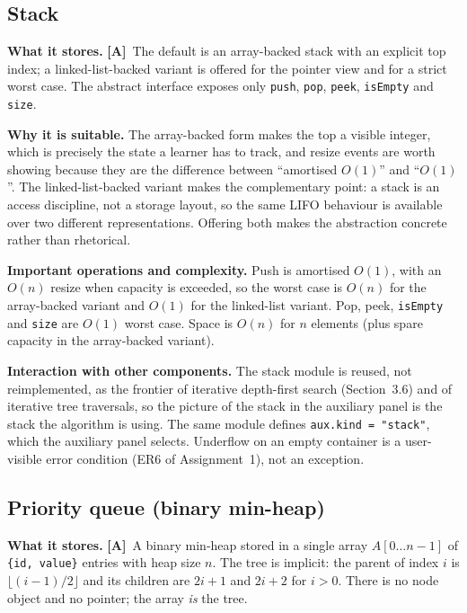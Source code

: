 \documentclass[11pt,a4paper]{article}
\newcommand{\A}{\textcolor{asmc}{\textbf{[A]}}}     %
\newcommand{\ct}[1]{\texttt{#1}}
\begin{document}
\subsection{Stack}

\noindent\textbf{What it stores.} \A\ The default is an array-backed stack with an explicit top
index; a linked-list-backed variant is offered for the pointer view and for a strict worst case.
The abstract interface exposes only \ct{push}, \ct{pop}, \ct{peek}, \ct{isEmpty} and \ct{size}.

\smallskip
\noindent\textbf{Why it is suitable.} The array-backed form makes the top a visible integer, which
is precisely the state a learner has to track, and resize events are worth showing because they
are the difference between ``amortised $O(1)$'' and ``$O(1)$''. The linked-list-backed variant
makes the complementary point: a stack is an access discipline, not a storage layout, so the same
LIFO behaviour is available over two different representations. Offering both makes the abstraction
concrete rather than rhetorical.

\smallskip
\noindent\textbf{Important operations and complexity.} Push is amortised $O(1)$, with an $O(n)$
resize when capacity is exceeded, so the worst case is $O(n)$ for the array-backed variant and
$O(1)$ for the linked-list variant. Pop, peek, \ct{isEmpty} and \ct{size} are $O(1)$ worst case.
Space is $O(n)$ for $n$ elements (plus spare capacity in the array-backed variant).

\smallskip
\noindent\textbf{Interaction with other components.} The stack module is reused, not reimplemented,
as the frontier of iterative depth-first search (Section~3.6) and of iterative tree traversals, so
the picture of the stack in the auxiliary panel is the stack the algorithm is using. The same
module defines \ct{aux.kind = "stack"}, which the auxiliary panel selects. Underflow on an empty
container is a user-visible error condition (ER6 of Assignment~1), not an exception.

\subsection{Priority queue (binary min-heap)}

\noindent\textbf{What it stores.} \A\ A binary min-heap stored in a single array $A[0\ldots n-1]$ of
\ct{\{id, value\}} entries with heap size $n$. The tree is implicit: the parent of index $i$ is
$\lfloor (i-1)/2\rfloor$ and its children are $2i+1$ and $2i+2$ for $i>0$. There is no node object
and no pointer; the array \emph{is} the tree.
\end{document}
